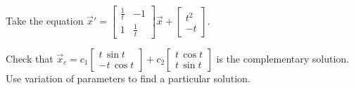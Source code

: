 \documentclass{ximera}
\begin{document}
\begin{exercise}
    Take the equation 
    $\displaystyle {\vec{x}}' =
    \begin{bmatrix}
        \frac{1}{t} & -1 \\
        1 & \frac{1}{t}
    \end{bmatrix}
    \vec{x} + \begin{bmatrix} t^2 \\ -t \end{bmatrix} .$
    \begin{tasks}
        \task Check that
            $\displaystyle \vec{x}_c = c_1
            \begin{bmatrix}
                t\, \sin t \\
                - t \, \cos t
            \end{bmatrix}
            + c_2
            \begin{bmatrix}
                t\, \cos t \\
                t \, \sin t
            \end{bmatrix}$
            is the complementary solution.
        \task Use variation of parameters to find a particular solution.
    \end{tasks}
\end{exercise}

\end{document}
